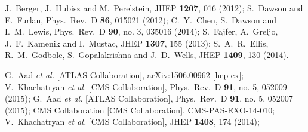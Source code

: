   J.~Berger, J.~Hubisz and M.~Perelstein,
  JHEP {\bf 1207}, 016 (2012);
  S.~Dawson and E.~Furlan,
  Phys.\ Rev.\ D {\bf 86}, 015021 (2012);
  C.~Y.~Chen, S.~Dawson and I.~M.~Lewis,
  Phys.\ Rev.\ D {\bf 90}, no. 3, 035016 (2014);
  S.~Fajfer, A.~Greljo, J.~F.~Kamenik and I.~Mustac,
  JHEP {\bf 1307}, 155 (2013);
  S.~A.~R.~Ellis, R.~M.~Godbole, S.~Gopalakrishna and J.~D.~Wells,
  JHEP {\bf 1409}, 130 (2014).

  G.~Aad {\it et al.} [ATLAS Collaboration],
  arXiv:1506.00962 [hep-ex]; 
  V.~Khachatryan {\it et al.} [CMS Collaboration],
  Phys.\ Rev.\ D {\bf 91}, no. 5, 052009 (2015);
  G.~Aad {\it et al.} [ATLAS Collaboration],
  Phys.\ Rev.\ D {\bf 91}, no. 5, 052007 (2015);
  CMS Collaboration [CMS Collaboration],
  CMS-PAS-EXO-14-010;
  V.~Khachatryan {\it et al.} [CMS Collaboration],
  JHEP {\bf 1408}, 174 (2014);

